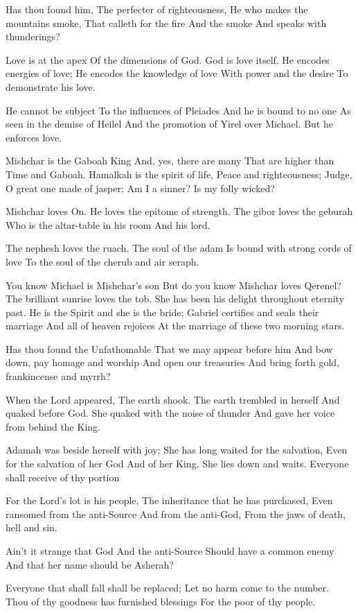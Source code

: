 \documentclass[
]{book}
\begin{document}
Has thou found him,
The perfecter of righteousness,
He who makes the mountains smoke,
That calleth for the fire
And the smoke
And speaks with thunderings?

Love is at the apex
Of the dimensions of God.
God is love itself.
He encodes energies of love;
He encodes the knowledge of love
With power and the desire
To demonstrate his love.

He cannot be subject
To the influences of Pleiades
And he is bound to no one
As seen in the demise of Heilel
And the promotion of Yirel over Michael.
But he enforces love.

Mishchar is the Gaboah King
And, yes, there are many
That are higher than Time and Gaboah.
Hamalkah is the spirit of life,
Peace and righteousness;
Judge, O great one made of jasper:
Am I a sinner? Is my folly wicked?

Mishchar loves On.
He loves the epitome of strength.
The gibor loves the geburah
Who is the altar-table in his room
And his lord.

The nephesh loves the ruach.
The soul of the adam
Is bound with strong cords of love
To the soul of the cherub and air seraph.

You know Michael is Mishchar's son
But do you know Mishchar loves Qerenel?
The brilliant sunrise loves the tob.
She has been his delight throughout eternity past.
He is the Spirit and she is the bride;
Gabriel certifies and seals their marriage
And all of heaven rejoices
At the marriage of these two morning stars.

Has thou found the Unfathomable
That we may appear before him
And bow down, pay homage and worship
And open our treasuries
And bring forth gold, frankincense and myrrh?

When the Lord appeared,
The earth shook.
The earth trembled in herself
And quaked before God.
She quaked with the noise of thunder
And gave her voice from behind the King.

Adamah was beside herself with joy;
She has long waited for the salvation,
Even for the salvation of her God
And of her King.
She lies down and waits.
Everyone shall receive of thy portion

For the Lord's lot is his people,
The inheritance that he has purchased,
Even ransomed from the anti-Source
And from the anti-God,
From the jaws of death, hell and sin.

Ain't it strange that God
And the anti-Source
Should have a common enemy
And that her name should be Asherah?

Everyone that shall fall shall be replaced;
Let no harm come to the number.
Thou of thy goodness has furnished blessings
For the poor of thy people.
\end{document}
